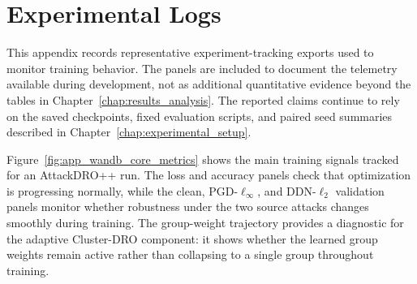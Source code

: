 



\chapter{Experimental Logs}
\label{app:logs}

This appendix records representative experiment-tracking exports used to monitor
training behavior. The panels are included to document the telemetry available
during development, not as additional quantitative evidence beyond the tables in
Chapter~\ref{chap:results_analysis}. The reported claims continue to rely on the
saved checkpoints, fixed evaluation scripts, and paired seed summaries described
in Chapter~\ref{chap:experimental_setup}.

Figure~\ref{fig:app_wandb_core_metrics} shows the main training signals tracked
for an AttackDRO++ run. The loss and accuracy panels check that optimization is
progressing normally, while the clean, PGD-$\ell_\infty$, and DDN-$\ell_2$
validation panels monitor whether robustness under the two source attacks
changes smoothly during training. The group-weight trajectory provides a
diagnostic for the adaptive Cluster-DRO component: it shows whether the learned
group weights remain active rather than collapsing to a single group throughout
training.

